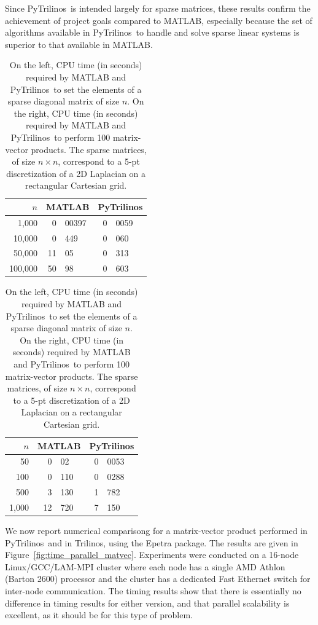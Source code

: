 \documentclass{llncs}
\newcommand{\PyTrilinos}{{\sc PyTrilinos}}
\begin{document}
Since \PyTrilinos\ is intended largely for sparse matrices, these
results confirm the achievement of project goals compared to MATLAB,
especially because the set of algorithms available in \PyTrilinos\ to
handle and solve sparse linear systems is superior to that available
in MATLAB.

\begin{table}
  \begin{center}
    \begin{tabular}{|r|r@{.}l|r@{.}l|}
      \hline
      $n$ & \multicolumn{2}{c|}{MATLAB} &
      \multicolumn{2}{c|}{\PyTrilinos} \\
      \hline
      \hline
        1,000 &  0&00397 & 0&0059   \\
       10,000 &  0&449   & 0&060    \\
       50,000 & 11&05    & 0&313    \\
      100,000 & 50&98    & 0&603    \\
      \hline
    \end{tabular}
    \hspace*{3mm}
    \begin{tabular}{|r|r@{.}l|r@{.}l|}
      \hline
      $n$ & \multicolumn{2}{c|}{MATLAB} &
      \multicolumn{2}{c|}{\PyTrilinos} \\
      \hline
      \hline
         50 &  0&02  & 0&0053 \\
        100 &  0&110 & 0&0288 \\
        500 &  3&130 & 1&782  \\
      1,000 & 12&720 & 7&150  \\
      \hline
    \end{tabular}
    \vspace*{1mm}
    \caption{On the left, CPU time (in seconds) required by MATLAB and
      \PyTrilinos\ to set the elements of a sparse diagonal matrix of
      size $n$. On the right, CPU time (in seconds) required by MATLAB and
      \PyTrilinos\ to perform 100 matrix-vector products.  The sparse
      matrices, of size $n \times n$, correspond to a 5-pt
      discretization of a 2D Laplacian on a rectangular Cartesian
      grid.}
    \label{tab:matlab_sparse}
  \end{center}
\end{table}

\smallskip

We now report numerical comparisong for a matrix-vector product performed
in \PyTrilinos\ and in Trilinos, using the Epetra package. The results are given
in Figure~\ref{fig:time_parallel_matvec}.
Experiments were conducted on
a 16-node Linux/GCC/LAM-MPI cluster where each node has a single AMD
Athlon (Barton 2600) processor and the cluster has a dedicated Fast
Ethernet switch for inter-node communication.  The timing results show
that there is essentially no difference in timing results for either
version, and that parallel scalability is excellent, as it should be
for this type of problem.
\end{document}
